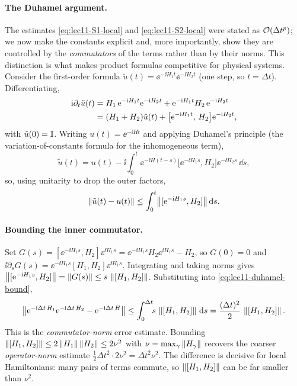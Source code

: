 \paragraph{The Duhamel argument.}
The estimates \eqref{eq:lec11-S1-local} and \eqref{eq:lec11-S2-local} were stated as
$\mathcal{O}(\Delta t^p)$; we now make the constants explicit and, more importantly, show they
are controlled by the \emph{commutators} of the terms rather than by their norms. This
distinction is what makes product formulas competitive for physical systems. Consider the
first-order formula $\tilde u(t)=\ee^{-\ii H_1 t}\ee^{-\ii H_2 t}$ (one step, so $t=\Delta
t$). Differentiating,
\begin{align}
  \mathrm{i}\partial_t\tilde u(t)
  &=H_1\,\mathrm{e}^{-\mathrm{i} H_1 t}\mathrm{e}^{-\mathrm{i} H_2 t}+\mathrm{e}^{-\mathrm{i} H_1 t}H_2\,\mathrm{e}^{-\mathrm{i} H_2 t}\notag\\
  &=(H_1+H_2)\tilde u(t)+\bigl[\mathrm{e}^{-\mathrm{i} H_1 t},\,H_2\bigr]\mathrm{e}^{-\mathrm{i} H_2 t},
  \label{eq:lec11-duhamel-ode}
\end{align}
with $\tilde u(0)=\mathbb{I}$. Writing $u(t)=\ee^{-\ii Ht}$ and applying Duhamel's principle (the
variation-of-constants formula for the inhomogeneous term),
\begin{equation}
  \tilde u(t)=u(t)-\ii\int_0^t\ee^{-\ii H(t-s)}\bigl[\ee^{-\ii H_1 s},H_2\bigr]
    \ee^{-\ii H_2 s}\,\dd s,
  \label{eq:lec11-duhamel}
\end{equation}
so, using unitarity to drop the outer factors,
\begin{equation}
  \left\lVert \tilde u(t)-u(t) \right\rVert\le\int_0^t\bigl\|[\mathrm{e}^{-\mathrm{i} H_1 s},H_2]\bigr\|\,\mathrm{d} s.
  \label{eq:lec11-duhamel-bound}
\end{equation}

\paragraph{Bounding the inner commutator.}
Set $G(s)=[\ee^{-\ii H_1 s},H_2]\ee^{\ii H_1 s}=\ee^{-\ii H_1 s}H_2\ee^{\ii H_1 s}-H_2$,
so $G(0)=0$ and $\ii\partial_s G(s)=\ee^{-\ii H_1 s}[H_1,H_2]\ee^{\ii H_1 s}$. Integrating
and taking norms gives $\left\lVert [\mathrm{e}^{-\mathrm{i} H_1 s},H_2] \right\rVert=\left\lVert G(s) \right\rVert\le s\,\left\lVert [H_1,H_2] \right\rVert$.
Substituting into \eqref{eq:lec11-duhamel-bound},
\begin{equation}
  \left\lVert \mathrm{e}^{-\mathrm{i}\Delta t\,H_1}\mathrm{e}^{-\mathrm{i}\Delta t\,H_2}-\mathrm{e}^{-\mathrm{i}\Delta t\,H} \right\rVert
  \le\int_0^{\Delta t}\!\!s\,\left\lVert [H_1,H_2] \right\rVert\,\mathrm{d} s
  =\frac{(\Delta t)^2}{2}\,\left\lVert [H_1,H_2] \right\rVert.
  \label{eq:lec11-commutator-bound}
\end{equation}
This is the \emph{commutator-norm} error estimate. Bounding
$\left\lVert [H_1,H_2] \right\rVert\le2\left\lVert H_1 \right\rVert\left\lVert H_2 \right\rVert\le2\nu^2$ with $\nu=\max_\gamma\left\lVert H_\gamma \right\rVert$
recovers the coarser \emph{operator-norm} estimate $\tfrac12\Delta t^2\cdot2\nu^2=\Delta
t^2\nu^2$. The difference is decisive for local Hamiltonians: many pairs of terms commute,
so $\left\lVert [H_1,H_2] \right\rVert$ can be far smaller than $\nu^2$.

